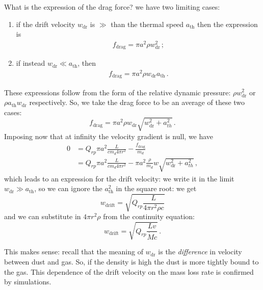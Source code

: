 \documentclass[main.tex]{subfiles}
\begin{document}
What is the expression of the drag force? we have two limiting cases: 
\begin{enumerate}
    \item if the drift velocity \(w _{\text{dr}}\) is \(\gg \) than the thermal speed \(a _{\text{th}}\) then the expression is 
    \begin{align}
    f _{\text{drag}} = \pi a^2 \rho w _{\text{dr}}^2
    \,;
    \end{align}
    \item if instead \(w _{\text{dr}} \ll a _{\text{th}}\), then 
    \begin{align}
    f _{\text{drag}}
    = \pi a^2 \rho w _{\text{dr}} a _{\text{th}}
    \,.
    \end{align}
\end{enumerate}

These expressions follow from the form of the relative dynamic pressure: \(\rho w^2 _{\text{dr}} \) or \(\rho a _{\text{th}} w _{\text{dr}}\) respectively.
So, we take the drag force to be an average of these two cases: 
%
\begin{equation}
f_{\text{drag}}=\pi a^2\rho w _{\text{dr}} \sqrt{w_{\text{dr}}^2+a_{th}^2}
\,.
\end{equation}
Imposing now that at infinity the velocity gradient is null, we have
\begin{subequations}
\begin{align}
0&=Q_{rp}\pi a^2 \frac{L}{c m_d 4\pi r^2}-\frac{f_{\text{drag}}}{m_d} \\
&= Q_{rp}\pi a^2 \frac{L}{c m_d 4\pi r^2}
- \pi a^2 \frac{\rho}{m_d} w \sqrt{w_{\text{dr}}^2+a_{th}^2} \,,
\end{align}
\end{subequations}
%
which leads to an expression for the drift velocity: we write it in the limit \(w _{\text{dr}} \gg a _{\text{th}}\), so we can ignore the \(a^2 _{\text{th}}\) in the square root: we get
%
\begin{equation}
w_{\text{drift}}=\sqrt{Q_{rp}\frac{L}{4\pi r^2\rho c}}
\end{equation}
%
and we can substitute in \(4 \pi r^2 \rho \) from the continuity equation:
%
\begin{equation}
w_{\text{drift}}=\sqrt{Q_{rp}\frac{L v}{\dot M c}}\,.
\end{equation}

This makes sense: recall that the meaning of \(w _{\text{dr}}\) is the \emph{difference} in velocity between dust and gas. So, if the density is high the dust is more tightly bound to the gas.
This dependence of the drift velocity on the mass loss rate is confirmed by simulations.
\end{document}
